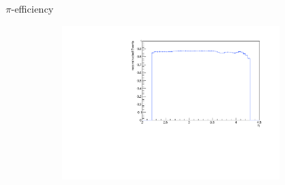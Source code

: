 \documentclass[11pt]{beamer}
\begin{document}
\begin{frame}{$\pi$-efficiency}
\begin{figure}
\begin{subfigure}{0.45\textwidth}
\end{subfigure}
\begin{subfigure}{0.45\textwidth}
\includegraphics[width=0.9\textwidth]{up_pdf/single/neg/h_eta_reco_Pi_neg.pdf}
\end{subfigure}
\end{figure}
\end{frame}
\end{document}

